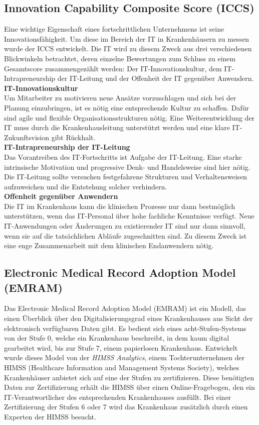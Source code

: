\subsection{Innovation Capability Composite Score (ICCS)}
	Eine wichtige Eigenschaft eines fortschrittlichen Unternehmens ist seine Innovationsfähigkeit. Um diese im Bereich der IT in Krankenhäusern zu messen wurde der ICCS entwickelt. Die IT wird zu diesem Zweck aus drei verschiedenen Blickwinkeln betrachtet, deren einzelne Bewertungen zum Schluss zu einem Gesamtscore zusammengezählt werden: Der IT-Innovationskultur, dem IT-Intrapreneurship der IT-Leitung und der Offenheit der IT gegenüber Anwendern. \parencite{huebner2019}
	\vspace{\parheadvspace}\\
	\textbf{IT-Innovationskultur}\\
	Um Mitarbeiter zu motivieren neue Ansätze vorzuschlagen und sich bei der Planung einzubringen, ist es nötig eine entsprechende Kultur zu schaffen. Dafür sind agile und flexible Organisationsstrukturen nötig. Eine Weiterentwicklung der IT muss durch die Krankenhausleitung unterstützt werden und eine klare IT-Zukunftsvision gibt Rückhalt.
	\vspace{\parheadvspace}\\
	\textbf{IT-Intrapreneurship der IT-Leitung}\\
	Das Vorantreiben des IT-Fortschritts ist Aufgabe der IT-Leitung. Eine starke intrinsische Motivation und progressive Denk- und Handelsweise sind hier nötig. Die IT-Leitung sollte versuchen festgefahrene Strukturen und Verhaltensweisen aufzuweichen und die Entstehung solcher verhindern.
	\vspace{\parheadvspace}\\
	\textbf{Offenheit gegenüber Anwendern}\\
	Die IT im Krankenhaus kann die klinischen Prozesse nur dann bestmöglich unterstützen, wenn das IT-Personal über hohe fachliche Kenntnisse verfügt. Neue IT-Anwendungen oder Änderungen zu existierender IT sind nur dann sinnvoll, wenn sie auf die tatsächlichen Abläufe zugeschnitten sind. Zu diesem Zweck ist eine enge Zusammenarbeit mit dem klinischen Endanwendern nötig.
\subsection{Electronic Medical Record Adoption Model (EMRAM)}
	Das Electronic Medical Record Adoption Model (EMRAM) ist ein Modell, das einen Überblick über den Digitalisierungsgrad eines Krankenhauses aus Sicht der elektronisch verfügbaren Daten gibt. Es bedient sich eines acht-Stufen-Systems von der Stufe 0, welche ein Krankenhaus beschreibt, in dem kaum digital gearbeitet wird, bis zur Stufe 7, einem papierlosen Krankenhaus. Entwickelt wurde dieses Model von der \textit{HIMSS Analytics}, einem Tochterunternehmen der HIMSS (Healthcare Information and Management Systems Society), welches Krankenhäuser anbietet sich auf eine der Stufen zu zertifizieren. Diese benötigten Daten zur Zertifizierung erhält die HIMSS über einen Online-Fragebogen, den ein IT-Verantwortlicher des entsprechenden Krankenhauses ausfüllt. Bei einer Zertifizierung der Stufen 6 oder 7 wird das Krankenhaus zusätzlich durch einen Experten der HIMSS besucht.

	\parencite{Stephani2019}
